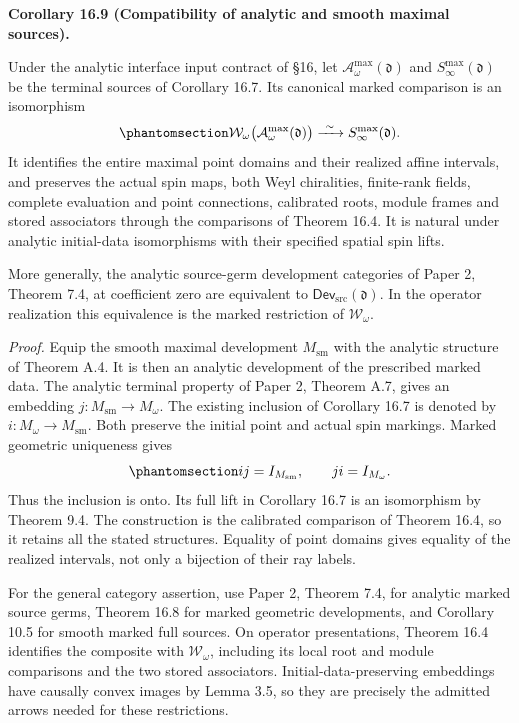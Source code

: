 \documentclass[
  english,
  11pt,
  reqno]{amsart}
\makeatletter
\newcommand{\pandocstatementheading}[1]{%
  \par\if@nobreak\else
    \addpenalty{\@beginparpenalty}%
    \addvspace{.5\baselineskip plus .2\baselineskip minus .2\baselineskip}%
  \fi
  {\normalfont\bfseries #1\par}%
  \nobreak\@afterindenttrue\@afterheading
}
\makeatother
\begin{document}
\pandocstatementheading{\protect{}\label{cor:analytic-smooth-maximal-source-isomorphism}Corollary 16.9 (Compatibility of analytic and smooth maximal sources).}

Under the analytic interface input contract of §16, let
\(\mathcal A^{\max}_\omega(\mathfrak d)\) and
\(S^{\max}_\infty(\mathfrak d)\) be the terminal sources of Corollary
16.7. Its canonical marked comparison is an isomorphism
\begin{equation}\protect\phantomsection\label{eq:analytic-smooth-maximal-source-isomorphism}{
\mathcal W_\omega\bigl(\mathcal A^{\max}_\omega(\mathfrak d)\bigr)
\xrightarrow{\ \sim\ }
S^{\max}_\infty(\mathfrak d).
}\end{equation} It identifies the entire maximal point domains and their
realized affine intervals, and preserves the actual spin maps, both Weyl
chiralities, finite-rank fields, complete evaluation and point
connections, calibrated roots, module frames and stored associators
through the comparisons of Theorem 16.4. It is natural under analytic
initial-data isomorphisms with their specified spatial spin lifts.

More generally, the analytic source-germ development categories of Paper
2, Theorem 7.4, at coefficient zero are equivalent to
\(\mathsf{Dev}_{\mathrm{src}}(\mathfrak d)\). In the operator
realization this equivalence is the marked restriction of
\(\mathcal W_\omega\).

\emph{Proof.} Equip the smooth maximal development \(M_{\mathrm{sm}}\)
with the analytic structure of Theorem A.4. It is then an analytic
development of the prescribed marked data. The analytic terminal
property of Paper 2, Theorem A.7, gives an embedding
\(j:M_{\mathrm{sm}}\to M_\omega\). The existing inclusion of Corollary
16.7 is denoted by \(i:M_\omega\to M_{\mathrm{sm}}\). Both preserve the
initial point and actual spin markings. Marked geometric uniqueness
gives
\begin{equation}\protect\phantomsection\label{eq:analytic-smooth-terminal-inverses}{
ij=I_{M_{\mathrm{sm}}},
\qquad
ji=I_{M_\omega}.
}\end{equation} Thus the inclusion is onto. Its full lift in Corollary
16.7 is an isomorphism by Theorem 9.4. The construction is the
calibrated comparison of Theorem 16.4, so it retains all the stated
structures. Equality of point domains gives equality of the realized
intervals, not only a bijection of their ray labels.

For the general category assertion, use Paper 2, Theorem 7.4, for
analytic marked source germs, Theorem 16.8 for marked geometric
developments, and Corollary 10.5 for smooth marked full sources. On
operator presentations, Theorem 16.4 identifies the composite with
\(\mathcal W_\omega\), including its local root and module comparisons
and the two stored associators. Initial-data-preserving embeddings have
causally convex images by Lemma 3.5, so they are precisely the admitted
arrows needed for these restrictions.
\end{document}

